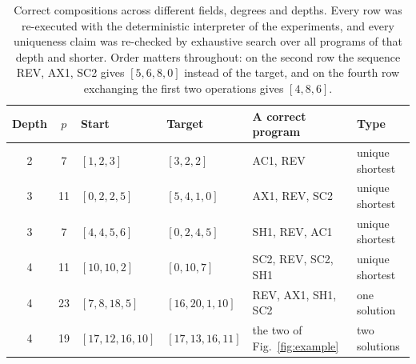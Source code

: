 \begin{table}[!tbh]
\centering\scriptsize\setlength{\tabcolsep}{3pt}
\begin{tabular}{|c|c|l|l|l|l|}
\hline
\textbf{Depth} & \textbf{$p$} & \textbf{Start} & \textbf{Target} & \textbf{A correct program} & \textbf{Type} \\
\hline
2 & 7  & $[1, 2, 3]$        & $[3, 2, 2]$        & AC1, REV           & unique shortest \\ \hline
3 & 11 & $[0, 2, 2, 5]$     & $[5, 4, 1, 0]$     & AX1, REV, SC2      & unique shortest \\ \hline
3 & 7  & $[4, 4, 5, 6]$     & $[0, 2, 4, 5]$     & SH1, REV, AC1      & unique shortest \\ \hline
4 & 11 & $[10, 10, 2]$      & $[0, 10, 7]$       & SC2, REV, SC2, SH1 & unique shortest \\ \hline
4 & 23 & $[7, 8, 18, 5]$    & $[16, 20, 1, 10]$  & REV, AX1, SH1, SC2 & one solution \\ \hline
4 & 19 & $[17, 12, 16, 10]$ & $[17, 13, 16, 11]$ & the two of Fig.~\ref{fig:example} & two solutions \\ \hline
\end{tabular}
\caption{Correct compositions across different fields, degrees and depths. Every
row was re-executed with the deterministic interpreter of the experiments, and
every uniqueness claim was re-checked by exhaustive search over all programs of
that depth and shorter. Order matters throughout: on the second row the sequence
REV, AX1, SC2 gives $[5, 6, 8, 0]$ instead of the target, and on the fourth row
exchanging the first two operations gives $[4, 8, 6]$.}
\label{tab:examples}
\end{table}
